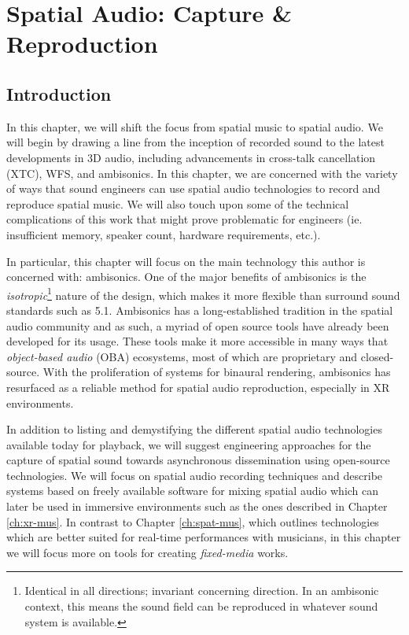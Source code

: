 \chapter{Spatial Audio: Capture \& Reproduction} \label{ch:spat-aud}

\section{Introduction}

In this chapter, we will shift the focus from spatial music to spatial audio. We will begin by drawing a line from the inception of recorded sound to the latest developments in 3D audio, including advancements in cross-talk cancellation (XTC), WFS, and ambisonics. In this chapter, we are concerned with the variety of ways that sound engineers can use spatial audio technologies to record and reproduce spatial music. We will also touch upon some of the technical complications of this work that might prove problematic for engineers (ie. insufficient memory, speaker count, hardware requirements, etc.).

In particular, this chapter will focus on the main technology this author is concerned with: ambisonics. One of the major benefits of ambisonics is the \textit{isotropic}\footnote{Identical in all directions; invariant concerning direction. In an ambisonic context, this means the sound field can be reproduced in whatever sound system is available.} nature of the design, which makes it more flexible than surround sound standards such as 5.1. Ambisonics has a long-established tradition in the spatial audio community and as such, a myriad of open source tools have already been developed for its usage. These tools make it more accessible in many ways that \textit{object-based audio} (OBA) ecosystems, most of which are proprietary and closed-source. With the proliferation of systems for binaural rendering, ambisonics has resurfaced as a reliable method for spatial audio reproduction, especially in XR environments.

In addition to listing and demystifying the different spatial audio technologies available today for playback, we will suggest engineering approaches for the capture of spatial sound towards asynchronous dissemination using open-source technologies. We will focus on spatial audio recording techniques and describe systems based on freely available software for mixing spatial audio which can later be used in immersive environments such as the ones described in Chapter \ref{ch:xr-mus}. In contrast to Chapter \ref{ch:spat-mus}, which outlines technologies which are better suited for real-time performances with musicians, in this chapter we will focus more on tools for creating \textit{fixed-media} works.

